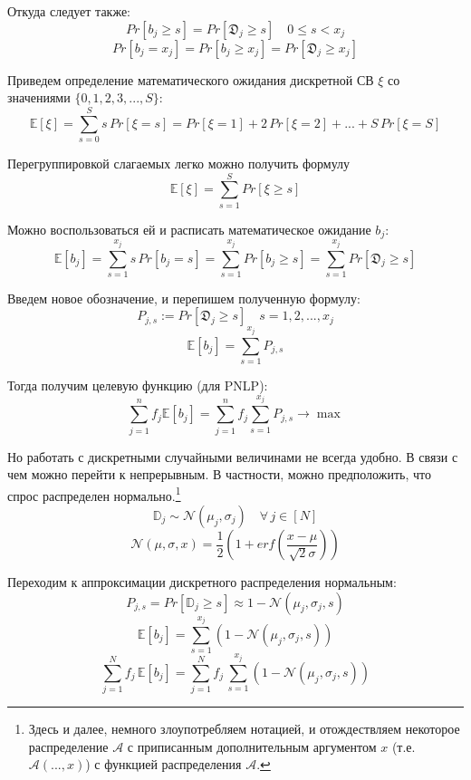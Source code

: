 \documentclass[reqno]{article}
\theoremstyle{definition}
\theoremstyle{definition}
\theoremstyle{definition}
\theoremstyle{definition}
\theoremstyle{definition}
\theoremstyle{definition}
\theoremstyle{definition}
\theoremstyle{definition}
\theoremstyle{definition}
\begin{document}
		Откуда следует также:
		$$Pr[b_j \geq s] = Pr[\mathfrak{D}_j \geq s]\quad 0 \leq s < x_j$$
		$$Pr[b_j = x_j] = Pr[b_j \geq x_j] = Pr[\mathfrak{D}_j \geq x_j]$$
		
		Приведем определение математического ожидания дискретной СВ $\xi$ со значениями $\{0, 1, 2, 3, ..., S\}$:
		$$\mathds{E}[\xi] = \sum\limits_{s = 0}^S s\,Pr[\xi = s] = Pr[\xi = 1] + 2\,Pr[\xi = 2] + ... + S\,Pr[\xi = S]$$
		
		Перегруппировкой слагаемых легко можно получить формулу
		\begin{equation}
			\mathds{E}[\xi] = \sum\limits_{s = 1}^S Pr[\xi \geq s]
		\end{equation}
	
		Можно воспользоваться ей и расписать математическое ожидание $b_j$:
		$$\mathds{E}[b_j] = \sum\limits_{s = 1}^{x_j} s\,Pr[b_j = s] = \sum\limits_{s = 1}^{x_j} Pr[b_j \geq s] = \sum\limits_{s = 1}^{x_j} Pr[\mathfrak{D}_j \geq s]$$
		
		Введем новое обозначение, и перепишем полученную формулу:
		$$P_{j,s} := Pr[\mathfrak{D}_j \geq s]\quad s = 1, 2, ..., x_j$$
		\begin{equation}
			\mathds{E}[b_j] = \sum\limits_{s = 1}^{x_j} P_{j,s}
		\end{equation}
		
		Тогда получим целевую функцию (для PNLP):
		\begin{equation}
			\sum\limits_{j=1}^n f_j \mathds{E}[b_j] = \sum\limits_{j=1}^n f_j \sum\limits_{s = 1}^{x_j} P_{j,s} \rightarrow \max
		\end{equation}
	
		Но работать с дискретными случайными величинами не всегда удобно. В связи с чем можно перейти к непрерывным. В частности, можно предположить, что спрос распределен нормально.\footnote{Здесь и далее, немного злоупотребляем нотацией, и отождествляем некоторое распределение $\mathcal{A}$ с приписанным дополнительным аргументом $x$ (т.е. $\mathcal{A}(..., x)$) с функцией распределения $\mathcal{A}$.}
		$$\mathds{D}_j \sim \mathcal{N}(\mu_j, \sigma_j) \quad \forall\, j \in [N]$$
		$$\mathcal{N}(\mu, \sigma, x) = \frac{1}{2}(1 + {erf}(\frac{x - \mu}{\sqrt{2}\sigma}))$$
		
		Переходим к аппроксимации дискретного распределения нормальным:
		$$P_{j,s} = Pr[\mathds{D}_j \geq s] \approx 1 - \mathcal{N}(\mu_j, \sigma_j, s)$$
		$$\mathds{E}[b_j] = \sum\limits_{s = 1}^{x_j} (1 - \mathcal{N}(\mu_j, \sigma_j, s))$$
		$$\sum\limits^N_{j = 1} f_j\,\mathds{E}[b_j] = \sum\limits^N_{j = 1} f_j\,\sum\limits_{s = 1}^{x_j} (1 - \mathcal{N}(\mu_j, \sigma_j, s))$$
		
\end{document}
